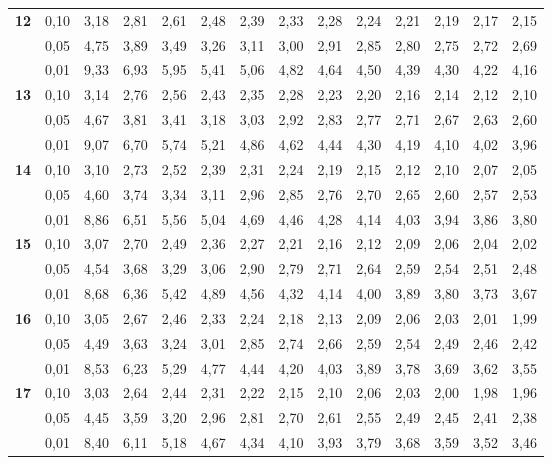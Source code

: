 \documentclass[12pt,a4paper]{article}
\begin{document}
{\begin{longtable}{@{\extracolsep{\fill}}rrrrrrrrrrrrrr@{}}
\addlinespace[1pt]
\textbf{12} & 0,10 & 3,18 & 2,81 & 2,61 & 2,48 & 2,39 & 2,33 & 2,28 & 2,24 & 2,21 & 2,19 & 2,17 & 2,15 \\*
 & 0,05 & 4,75 & 3,89 & 3,49 & 3,26 & 3,11 & 3,00 & 2,91 & 2,85 & 2,80 & 2,75 & 2,72 & 2,69 \\*
 & 0,01 & 9,33 & 6,93 & 5,95 & 5,41 & 5,06 & 4,82 & 4,64 & 4,50 & 4,39 & 4,30 & 4,22 & 4,16 \\
\addlinespace[1pt]
\textbf{13} & 0,10 & 3,14 & 2,76 & 2,56 & 2,43 & 2,35 & 2,28 & 2,23 & 2,20 & 2,16 & 2,14 & 2,12 & 2,10 \\*
 & 0,05 & 4,67 & 3,81 & 3,41 & 3,18 & 3,03 & 2,92 & 2,83 & 2,77 & 2,71 & 2,67 & 2,63 & 2,60 \\*
 & 0,01 & 9,07 & 6,70 & 5,74 & 5,21 & 4,86 & 4,62 & 4,44 & 4,30 & 4,19 & 4,10 & 4,02 & 3,96 \\
\addlinespace[1pt]
\textbf{14} & 0,10 & 3,10 & 2,73 & 2,52 & 2,39 & 2,31 & 2,24 & 2,19 & 2,15 & 2,12 & 2,10 & 2,07 & 2,05 \\*
 & 0,05 & 4,60 & 3,74 & 3,34 & 3,11 & 2,96 & 2,85 & 2,76 & 2,70 & 2,65 & 2,60 & 2,57 & 2,53 \\*
 & 0,01 & 8,86 & 6,51 & 5,56 & 5,04 & 4,69 & 4,46 & 4,28 & 4,14 & 4,03 & 3,94 & 3,86 & 3,80 \\
\addlinespace[1pt]
\textbf{15} & 0,10 & 3,07 & 2,70 & 2,49 & 2,36 & 2,27 & 2,21 & 2,16 & 2,12 & 2,09 & 2,06 & 2,04 & 2,02 \\*
 & 0,05 & 4,54 & 3,68 & 3,29 & 3,06 & 2,90 & 2,79 & 2,71 & 2,64 & 2,59 & 2,54 & 2,51 & 2,48 \\*
 & 0,01 & 8,68 & 6,36 & 5,42 & 4,89 & 4,56 & 4,32 & 4,14 & 4,00 & 3,89 & 3,80 & 3,73 & 3,67 \\
\addlinespace[1pt]
\textbf{16} & 0,10 & 3,05 & 2,67 & 2,46 & 2,33 & 2,24 & 2,18 & 2,13 & 2,09 & 2,06 & 2,03 & 2,01 & 1,99 \\*
 & 0,05 & 4,49 & 3,63 & 3,24 & 3,01 & 2,85 & 2,74 & 2,66 & 2,59 & 2,54 & 2,49 & 2,46 & 2,42 \\*
 & 0,01 & 8,53 & 6,23 & 5,29 & 4,77 & 4,44 & 4,20 & 4,03 & 3,89 & 3,78 & 3,69 & 3,62 & 3,55 \\
\addlinespace[1pt]
\textbf{17} & 0,10 & 3,03 & 2,64 & 2,44 & 2,31 & 2,22 & 2,15 & 2,10 & 2,06 & 2,03 & 2,00 & 1,98 & 1,96 \\*
 & 0,05 & 4,45 & 3,59 & 3,20 & 2,96 & 2,81 & 2,70 & 2,61 & 2,55 & 2,49 & 2,45 & 2,41 & 2,38 \\*
 & 0,01 & 8,40 & 6,11 & 5,18 & 4,67 & 4,34 & 4,10 & 3,93 & 3,79 & 3,68 & 3,59 & 3,52 & 3,46 \\

\end{longtable}}
\end{document}

